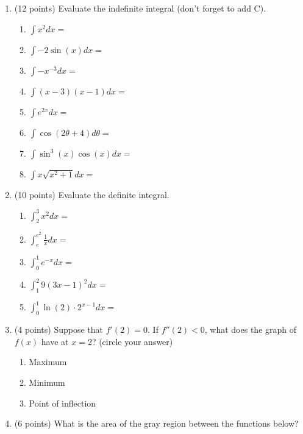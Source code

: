 \documentclass[11pt]{article}
\begin{document}
\begin{enumerate}[itemsep=30pt]
\item (12 points) Evaluate the indefinite integral (don't forget to add C).
\begin{enumerate}[itemsep=45pt]
    \item $\displaystyle \int x^2 dx = $
    \item $\displaystyle \int -2\sin(x) dx = $
    \item $\displaystyle \int -x^{-3} dx = $
    \item $\displaystyle \int (x-3)(x-1) dx = $
    \item $\displaystyle \int e^{2x} dx = $
    \item $\displaystyle \int \cos(2\theta+4) d\theta = $
    \item $\displaystyle \int \sin^3(x)\cos(x) dx = $
    \item $\displaystyle \int x \sqrt{x^2+1}  dx = $
\end{enumerate}

\newpage

\item (10 points) Evaluate the definite integral.
\begin{enumerate}[itemsep=80pt]
    \item $\displaystyle \int_{2}^{3} x^2 dx = $
    \item $\displaystyle \int_{e}^{e^2} \frac{1}{x} dx = $
    \item $\displaystyle \int_{0}^{1} e^{-x} dx = $
    \item $\displaystyle \int_{1}^{2} 9(3x - 1)^2 dx = $
    \item $\displaystyle \int_{0}^{1} \ln(2) \cdot 2^{x-1} dx = $
\end{enumerate}
\vspace{60pt}

\newpage


\vspace{10 mm}

\item (4 points) Suppose that $f'(2)=0$.  If $f''(2) < 0$, what does the graph of $f(x)$ have at $x=2$? (circle your answer)
\begin{enumerate}
    \item Maximum
    \item Minimum
    \item Point of inflection
\end{enumerate}

\item (6 points) What is the area of the gray region between the functions below?


\end{enumerate}
\end{document}
